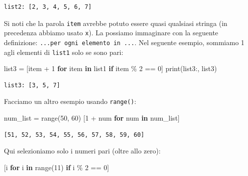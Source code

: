 \documentclass[
  letterpaper,
  krantz2]{{[}./krantz{]}}
\newenvironment{Shaded}{\begin{snugshade}}{\end{snugshade}}
\newcommand{\BuiltInTok}[1]{\textcolor[rgb]{0.00,0.23,0.31}{#1}}
\newcommand{\ControlFlowTok}[1]{\textcolor[rgb]{0.00,0.23,0.31}{\textbf{#1}}}
\newcommand{\DecValTok}[1]{\textcolor[rgb]{0.68,0.00,0.00}{#1}}
\newcommand{\KeywordTok}[1]{\textcolor[rgb]{0.00,0.23,0.31}{\textbf{#1}}}
\newcommand{\NormalTok}[1]{\textcolor[rgb]{0.00,0.23,0.31}{#1}}
\newcommand{\OperatorTok}[1]{\textcolor[rgb]{0.37,0.37,0.37}{#1}}
\newcommand{\StringTok}[1]{\textcolor[rgb]{0.13,0.47,0.30}{#1}}
\begin{document}
\begin{verbatim}
list2: [2, 3, 4, 5, 6, 7]
\end{verbatim}

Si noti che la parola \texttt{item} avrebbe potuto essere quasi
qualsiasi stringa (in precedenza abbiamo usato \texttt{x}). La possiamo
immaginare con la seguente definizione:
\texttt{...per\ ogni\ elemento\ in\ ...}. Nel seguente esempio, sommiamo
1 agli elementi di \texttt{list1} solo se sono pari:

\begin{Shaded}
\begin{Highlighting}[]
\NormalTok{list3 }\OperatorTok{=}\NormalTok{ [item }\OperatorTok{+} \DecValTok{1} \ControlFlowTok{for}\NormalTok{ item }\KeywordTok{in}\NormalTok{ list1 }\ControlFlowTok{if}\NormalTok{ item }\OperatorTok{\%} \DecValTok{2} \OperatorTok{==} \DecValTok{0}\NormalTok{] }
\BuiltInTok{print}\NormalTok{(}\StringTok{\textquotesingle{}list3:\textquotesingle{}}\NormalTok{, list3)}
\end{Highlighting}
\end{Shaded}

\begin{verbatim}
list3: [3, 5, 7]
\end{verbatim}

Facciamo un altro esempio usando \texttt{range()}:

\begin{Shaded}
\begin{Highlighting}[]
\NormalTok{num\_list }\OperatorTok{=} \BuiltInTok{range}\NormalTok{(}\DecValTok{50}\NormalTok{, }\DecValTok{60}\NormalTok{)}
\NormalTok{[}\DecValTok{1} \OperatorTok{+}\NormalTok{ num }\ControlFlowTok{for}\NormalTok{ num }\KeywordTok{in}\NormalTok{ num\_list]}
\end{Highlighting}
\end{Shaded}

\begin{verbatim}
[51, 52, 53, 54, 55, 56, 57, 58, 59, 60]
\end{verbatim}

Qui selezioniamo solo i numeri pari (oltre allo zero):

\begin{Shaded}
\begin{Highlighting}[]
\NormalTok{[i }\ControlFlowTok{for}\NormalTok{ i }\KeywordTok{in} \BuiltInTok{range}\NormalTok{(}\DecValTok{11}\NormalTok{) }\ControlFlowTok{if}\NormalTok{ i }\OperatorTok{\%} \DecValTok{2} \OperatorTok{==} \DecValTok{0}\NormalTok{]}
\end{Highlighting}
\end{Shaded}
\end{document}
